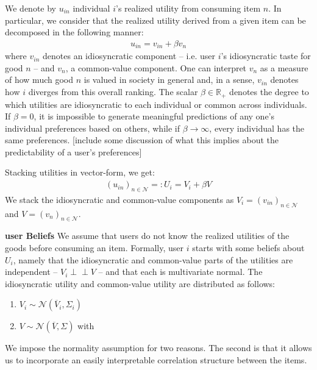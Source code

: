 \documentclass[sigconf]{acmart}
\begin{document}
We denote by $u_{in}$ individual $i$'s realized utility from consuming item $n$. In particular, we consider that the realized utility derived from a given item can be decomposed in the following manner:
\begin{align*}
u_{in}= v_{in} + \beta v_n
\end{align*}
where $v_{in}$ denotes an idiosyncratic component -- i.e. user $i$'s idiosyncratic taste for good $n$ --  and $v_{n}$, a common-value component. One can interpret $v_n$ as a measure of how much good $n$ is valued in society in general and, in a sense, $v_{in}$ denotes how $i$ diverges from this overall ranking. The scalar $\beta \in \mathbb{R}_{+}$ denotes the degree to which utilities are idiosyncratic to each individual or common across individuals. If $\beta=0$, it is impossible to generate meaningful predictions of any one's individual preferences based on others, while if $\beta \rightarrow \infty$, every individual has the same preferences. [include some discussion of what this implies about the predictability of a user's preferences]

Stacking utilities in vector-form, we get:
\begin{align*}
{\left(u_{in}\right)}_{n \in \mathcal{N}}=:U_i=V_i+ \beta V
\end{align*}
We stack the idiosyncratic and common-value components as $V_i ={\left(v_{in}\right)}_{n \in \mathcal{N}}$ and $V={\left(v_{n}\right)}_{n \in \mathcal{N}}$.
\par
\noindent \textbf{user Beliefs} We assume that users do not know the realized utilities of the goods before consuming an item.  Formally, user $i$ starts with some beliefs about $U_i$, namely that the idiosyncratic and common-value parts of the utilities are independent -- $V_i \perp \!\!\! \perp V$ -- and that each is multivariate normal. The idiosyncratic utility and common-value utility are distributed as follows:
\begin{enumerate}
\item $V_i \sim \mathcal N (\overline V_i, \Sigma_i)$ 
\item $V \sim \mathcal N(\overline V, \Sigma)$ with 
\end{enumerate}

We impose the normality assumption for two reasons.  The second is that it allows us to incorporate an easily interpretable correlation structure between the items.
\end{document}
